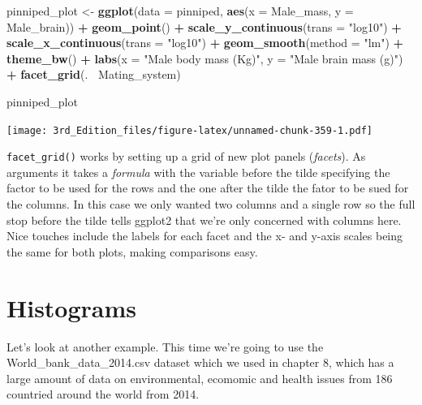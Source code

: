 \documentclass[
]{book}
\newenvironment{Shaded}{\begin{snugshade}}{\end{snugshade}}
\newcommand{\DataTypeTok}[1]{\textcolor[rgb]{0.13,0.29,0.53}{#1}}
\newcommand{\KeywordTok}[1]{\textcolor[rgb]{0.13,0.29,0.53}{\textbf{#1}}}
\newcommand{\NormalTok}[1]{#1}
\newcommand{\OperatorTok}[1]{\textcolor[rgb]{0.81,0.36,0.00}{\textbf{#1}}}
\newcommand{\StringTok}[1]{\textcolor[rgb]{0.31,0.60,0.02}{#1}}
\begin{document}
\begin{Shaded}
\begin{Highlighting}[]

\NormalTok{pinniped_plot <-}\StringTok{ }\KeywordTok{ggplot}\NormalTok{(}\DataTypeTok{data =}\NormalTok{ pinniped, }\KeywordTok{aes}\NormalTok{(}\DataTypeTok{x =}\NormalTok{ Male_mass, }\DataTypeTok{y =}\NormalTok{ Male_brain)) }\OperatorTok{+}
\StringTok{        }\KeywordTok{geom_point}\NormalTok{() }\OperatorTok{+}\StringTok{ }
\StringTok{        }\KeywordTok{scale_y_continuous}\NormalTok{(}\DataTypeTok{trans =} \StringTok{"log10"}\NormalTok{) }\OperatorTok{+}
\StringTok{        }\KeywordTok{scale_x_continuous}\NormalTok{(}\DataTypeTok{trans =} \StringTok{"log10"}\NormalTok{) }\OperatorTok{+}
\StringTok{        }\KeywordTok{geom_smooth}\NormalTok{(}\DataTypeTok{method =} \StringTok{"lm"}\NormalTok{) }\OperatorTok{+}
\StringTok{        }\KeywordTok{theme_bw}\NormalTok{() }\OperatorTok{+}
\StringTok{        }\KeywordTok{labs}\NormalTok{(}\DataTypeTok{x =} \StringTok{"Male body mass (Kg)"}\NormalTok{,}
             \DataTypeTok{y =} \StringTok{"Male brain mass (g)"}\NormalTok{) }\OperatorTok{+}
\StringTok{        }\KeywordTok{facet_grid}\NormalTok{(.}\OperatorTok{~}\StringTok{ }\NormalTok{Mating_system)}

\NormalTok{pinniped_plot}
\end{Highlighting}
\end{Shaded}

\texttt{[image: 3rd\_Edition\_files/figure-latex/unnamed-chunk-359-1.pdf]}

\texttt{facet\_grid()} works by setting up a grid of new plot panels (\emph{facets}). As arguments it takes a \emph{formula} with the variable before the tilde specifying the factor to be used for the rows and the one after the tilde the fator to be sued for the columns. In this case we only wanted two columns and a single row so the full stop before the tilde tells ggplot2 that we're only concerned with columns here. Nice touches include the labels for each facet and the x- and y-axis scales being the same for both plots, making comparisons easy.

\hypertarget{histograms}{%
\section{Histograms}\label{histograms}}

Let's look at another example. This time we're going to use the World\_bank\_data\_2014.csv dataset which we used in chapter 8, which has a large amount of data on environmental, ecomomic and health issues from 186 countried around the world from 2014.
\end{document}
